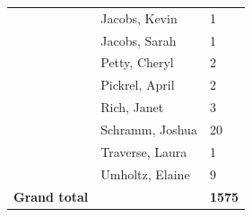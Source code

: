 \documentclass{article}\usepackage[]{graphicx}\usepackage[]{color}
\begin{document}
{\begin{longtable} { >{\raggedright}p{}|p{}p{}}
   \rowcolor[gray]{0.90} & Jacobs, Kevin & 1 \\ 
   & Jacobs, Sarah & 1 \\ 
   & Petty, Cheryl & 2 \\ 
   & Pickrel, April & 2 \\ 
   \rowcolor[gray]{0.90} & Rich, Janet & 3 \\ 
   \rowcolor[gray]{0.90} & Schramm, Joshua & 20 \\ 
   \rowcolor[gray]{0.90} & Traverse, Laura & 1 \\ 
   & Umholtz, Elaine & 9 \\ 
  \textbf{Grand total} &  & \textbf{1575} \\ 
   \end{longtable}

}

\pagebreak
\end{document}
